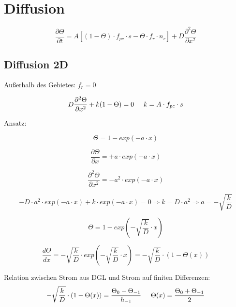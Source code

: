 \section{Diffusion}

\begin{equation}
\frac{\partial\Theta}{\partial t} = A[(1-\Theta)\cdot f_{pc} \cdot s - \Theta\cdot f_r\cdot n_r] + D\frac{\partial^2\Theta}{\partial x^2}
\end{equation}

\subsection{Diffusion 2D}
Au\ss erhalb des Gebietes: $f_r = 0$

\begin{equation}
D\frac{\partial^2 \Theta}{\partial x^2} + k(1-\Theta) = 0 \hspace{0.5cm} k = A\cdot f_{pc} \cdot s
\end{equation}

Ansatz:

\begin{equation}
\Theta = 1 - exp(-a\cdot x)
\end{equation}

\begin{equation}
\frac{\partial\Theta}{\partial x} = +a\cdot exp(-a\cdot x)
\end{equation}

\begin{equation}
\frac{\partial^2\Theta}{\partial x^2} = -a^2\cdot exp(-a\cdot x)
\end{equation}

\begin{equation}
-D\cdot a^2 \cdot exp(-a \cdot x) + k\cdot exp(-a \cdot x) = 0 \Rightarrow k = D\cdot a^2 \Rightarrow a = -\sqrt{\frac{k}{D}}
\end{equation}

\begin{equation}
\Theta = 1 - exp(-\sqrt{\frac{k}{D}}\cdot x)
\end{equation}

\begin{equation}
\frac{d\Theta}{dx} = - \sqrt{\frac{k}{D}}\cdot exp(-\sqrt{\frac{k}{D}}\cdot x) = -\sqrt{\frac{k}{D}}\cdot (1-\Theta(x))
\end{equation}

Relation zwischen Strom aus DGL und Strom auf finiten Differenzen:
\begin{equation}
-\sqrt{\frac{k}{D}}\cdot (1-\Theta(x)) = \frac{\Theta_0 - \Theta_{-1}}{h_{-1}} \hspace{0.5cm}\Theta(x) =  \frac{\Theta_0 + \Theta_{-1}}{2}
\end{equation}

